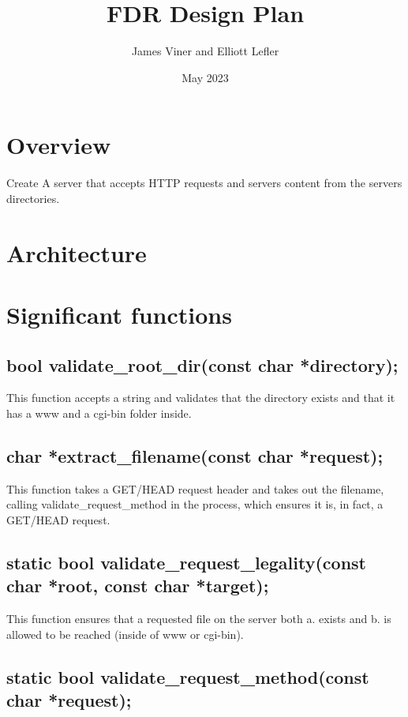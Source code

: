 \documentclass{article}
\title{FDR Design Plan}
\author{James Viner and Elliott Lefler}
\date{May 2023}
\begin{document}
\maketitle
\section*{\textbf{Overview}}
Create A server that accepts HTTP requests and servers content from the servers directories.

\section*{\Huge{Architecture}}

\section*{\huge{Significant functions}}


\subsection*{bool validate\_root\_dir(const char *directory);}
\hspace{.5cm} This function accepts a string and validates that the directory exists and that it has a www and a cgi-bin folder inside.

\subsection*{char *extract\_filename(const char *request);}
\hspace{.5cm} This function takes a GET/HEAD request header and takes out the filename, calling validate\_request\_method in the process, which ensures it is, in fact, a GET/HEAD request.


\subsection*{static bool validate\_request\_legality(const char *root, const char *target);}
\hspace{.5cm} This function ensures that a requested file on the server both a. exists and b. is allowed to be reached (inside of www or cgi-bin).

\subsection*{static bool validate\_request\_method(const char *request);}
\end{document}
